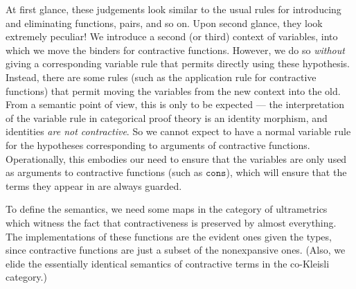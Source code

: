 \documentclass[nocopyrightspace,preprint]{sigplanconf}
\newcommand{\term}[1]{\ensuremath{\mathtt{{#1}}}}
\begin{document}
At first glance, these judgements look similar to the usual rules for
introducing and eliminating functions, pairs, and so on. Upon second
glance, they look extremely peculiar! We introduce a second (or third)
context of variables, into which we move the binders for contractive
functions. However, we do so \emph{without} giving a corresponding
variable rule that permits directly using these hypothesis. Instead,
there are some rules (such as the application rule for contractive
functions) that permit moving the variables from the new context into
the old. From a semantic point of view, this is only to be expected ---
the interpretation of the variable rule in categorical proof theory is
an identity morphism, and identities \emph{are not contractive}. So we
cannot expect to have a normal variable rule for the hypotheses
corresponding to arguments of contractive functions. Operationally,
this embodies our need to ensure that the variables are only used as
arguments to contractive functions (such as \term{cons}), which will
ensure that the terms they appear in are always guarded.

To define the semantics, we need some maps in the category of
ultrametrics which witness the fact that contractiveness is preserved
by almost everything. The implementations of these functions are the
evident ones given the types, since contractive functions are just a
subset of the nonexpansive ones. (Also, we elide the essentially
identical semantics of contractive terms in the co-Kleisli category.)
\end{document}
